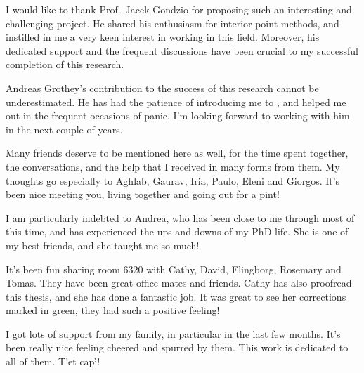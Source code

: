 
%
%

I would like to thank Prof.~Jacek Gondzio for proposing such an
interesting and challenging project. 
He shared his enthusiasm for interior point methods, and 
instilled in me a very keen interest in working in this field.
Moreover, his dedicated support and the frequent discussions
have been crucial to my successful
completion of this research.

Andreas Grothey's contribution to the success of this research
cannot be underestimated. 
He has had the patience of introducing me to \OOPS, and helped me out
in the frequent occasions of panic.
I'm looking forward to working with him in the next couple of years.

Many friends deserve to be mentioned here as well, for the time spent together,
the conversations, and the help that I received in many forms from them.
My thoughts go especially to Aghlab, Gaurav, Iria, Paulo, Eleni and Giorgos. 
It's been nice meeting you, living together and going out for a pint!

I am particularly indebted to Andrea, who has been close to me through
most of this time, and has experienced the ups and downs of my PhD life.
She is one of my best friends, and she taught me so much!

It's been fun sharing room 6320 with Cathy, David, Elingborg, Rosemary
and Tomas. They have been great office mates and
friends.
Cathy has also proofread this thesis, and she has done a fantastic job. 
It was great to see her corrections marked in green, they had such a 
positive feeling!

I got lots of support from my family, in particular in the last few months.
It's been really nice feeling cheered and spurred by them.
This work is dedicated to all of them. T'et cap\`i!
